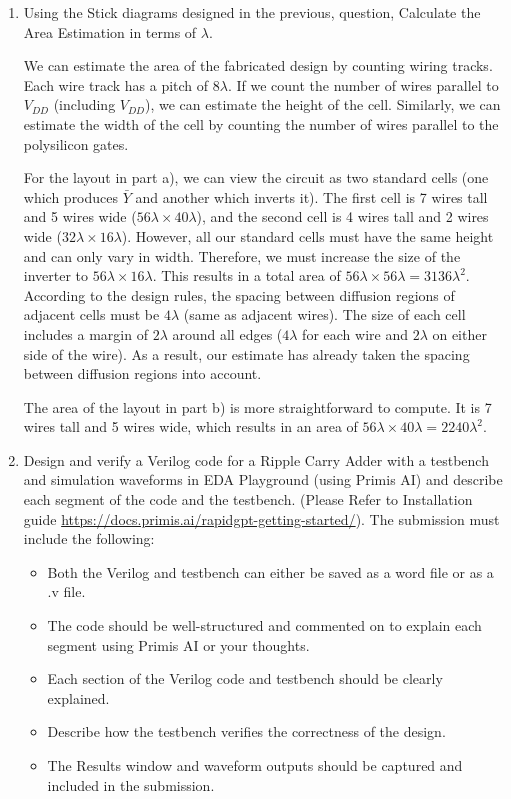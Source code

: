 \documentclass[fleqn]{article}
\begin{document}
\begin{enumerate}
		\item Using the Stick diagrams designed in the previous, question, Calculate the Area Estimation in terms of $\lambda$.
			
		We can estimate the area of the fabricated design by counting wiring tracks. Each wire track has a pitch of $8\lambda$. If we count the number of wires parallel to $V_{DD}$ (including $V_{DD}$), we can estimate the height of the cell. Similarly, we can estimate the width of the cell by counting the number of wires parallel to the polysilicon gates.
		
		For the layout in part a), we can view the circuit as two standard cells (one which produces $\bar{Y}$ and another which inverts it). The first cell is 7 wires tall and 5 wires wide ($56 \lambda \times 40 \lambda$), and the second cell is 4 wires tall and 2 wires wide ($32 \lambda \times 16 \lambda$). However, all our standard cells must have the same height and can only vary in width. Therefore, we must increase the size of the inverter to $56 \lambda \times 16 \lambda$. This results in a total area of $56 \lambda \times 56 \lambda = 3136 \lambda^2$. According to the design rules, the spacing between diffusion regions of adjacent cells must be $4\lambda$ (same as adjacent wires). The size of each cell includes a margin of $2\lambda$ around all edges ($4\lambda$ for each wire and $2\lambda$ on either side of the wire). As a result, our estimate has already taken the spacing between diffusion regions into account.
		
		The area of the layout in part b) is more straightforward to compute. It is 7 wires tall and 5 wires wide, which results in an area of $56 \lambda \times 40 \lambda = 2240\lambda^2$.
		 
		 \item Design and verify a Verilog code for a Ripple Carry Adder with a testbench and simulation waveforms in EDA Playground (using Primis AI) and describe each segment of the code and the testbench. (Please Refer to Installation guide \url{https://docs.primis.ai/rapidgpt-getting-started/}). The submission must include the following:
		 
		 \begin{itemize}
		 	\item Both the Verilog and testbench can either be saved as a word file or as a .v file.
		 	\item The code should be well-structured and commented on to explain each segment using 
Primis AI or your thoughts.
			\item Each section of the Verilog code and testbench should be clearly explained.
			\item Describe how the testbench verifies the correctness of the design. 
			\item The Results window and waveform outputs should be captured and included in the 
submission.
		 \end{itemize}
		 

\end{enumerate}
\end{document}
